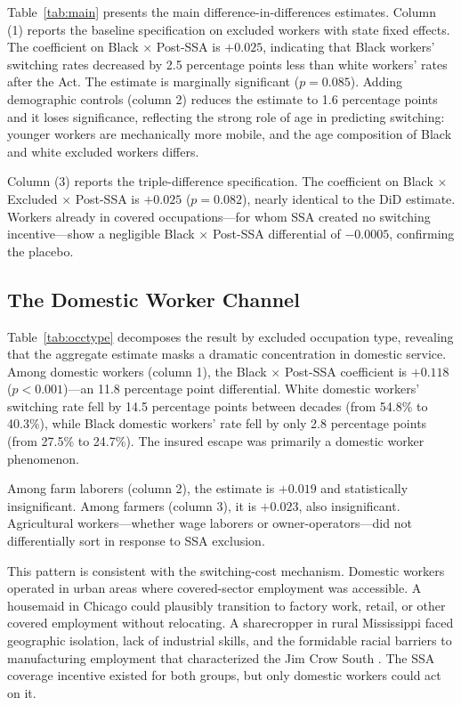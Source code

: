 \documentclass[12pt]{article}
\begin{document}
Table~\ref{tab:main} presents the main difference-in-differences estimates. Column (1) reports the baseline specification on excluded workers with state fixed effects. The coefficient on Black $\times$ Post-SSA is $+0.025$, indicating that Black workers' switching rates decreased by 2.5 percentage points less than white workers' rates after the Act. The estimate is marginally significant ($p = 0.085$). Adding demographic controls (column 2) reduces the estimate to 1.6 percentage points and it loses significance, reflecting the strong role of age in predicting switching: younger workers are mechanically more mobile, and the age composition of Black and white excluded workers differs.

Column (3) reports the triple-difference specification. The coefficient on Black $\times$ Excluded $\times$ Post-SSA is $+0.025$ ($p = 0.082$), nearly identical to the DiD estimate. Workers already in covered occupations---for whom SSA created no switching incentive---show a negligible Black $\times$ Post-SSA differential of $-0.0005$, confirming the placebo.

\subsection{The Domestic Worker Channel}



Table~\ref{tab:occtype} decomposes the result by excluded occupation type, revealing that the aggregate estimate masks a dramatic concentration in domestic service. Among domestic workers (column 1), the Black $\times$ Post-SSA coefficient is $+0.118$ ($p < 0.001$)---an 11.8 percentage point differential. White domestic workers' switching rate fell by 14.5 percentage points between decades (from 54.8\% to 40.3\%), while Black domestic workers' rate fell by only 2.8 percentage points (from 27.5\% to 24.7\%). The insured escape was primarily a domestic worker phenomenon.

Among farm laborers (column 2), the estimate is $+0.019$ and statistically insignificant. Among farmers (column 3), it is $+0.023$, also insignificant. Agricultural workers---whether wage laborers or owner-operators---did not differentially sort in response to SSA exclusion.

This pattern is consistent with the switching-cost mechanism. Domestic workers operated in urban areas where covered-sector employment was accessible. A housemaid in Chicago could plausibly transition to factory work, retail, or other covered employment without relocating. A sharecropper in rural Mississippi faced geographic isolation, lack of industrial skills, and the formidable racial barriers to manufacturing employment that characterized the Jim Crow South \citep{whatley1990, sundstrom1994}. The SSA coverage incentive existed for both groups, but only domestic workers could act on it.
\end{document}
